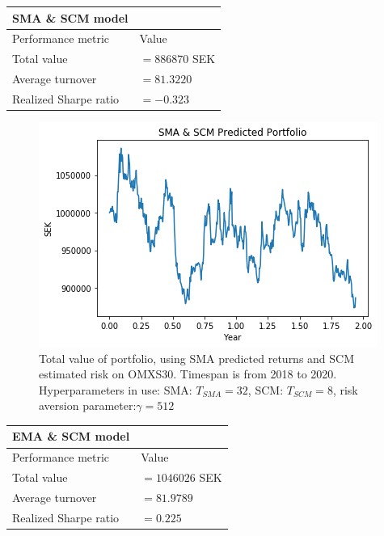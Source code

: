\documentclass[final]{LTHtwocol} %
\begin{document}
\begin{center}
 \begin{tabular}{||l l||} 
 \hline
 \textbf{SMA \& SCM  model} & \\ [0.5ex] 
 \hline
 Performance metric & Value\\ [0.5ex] 
 \hline\hline
 Total value & $=886870$ SEK \\ 
 \hline
 Average turnover& $=81.3220$ \\
 \hline
 Realized Sharpe ratio & $=-0.323$ \\  [1ex] 
 \hline
\end{tabular}
\label{tab:SMA and SCM data}
\end{center}
\begin{figure}[h]
	\centering
	\includegraphics[width=0.8\columnwidth]{Pics/result/SMA_SCM.png}
	\caption{Total value of portfolio, using SMA predicted returns and SCM estimated risk on OMXS30. Timespan is from 2018 to 2020. Hyperparameters in use: SMA: $T_{SMA} =32$, SCM: $T_{SCM} = 8$, risk aversion parameter:$\gamma= 512$}
	\label{fig:SMASCM} 
\end{figure}
\begin{center}
 \begin{tabular}{||l l||} 
 \hline
 \textbf{EMA \& SCM  model} & \\ [0.5ex] 
 \hline
 Performance metric & Value\\ [0.5ex] 
 \hline\hline
 Total value & $=1046026$ SEK \\ 
 \hline
 Average turnover& $=81.9789$ \\
 \hline
 Realized Sharpe ratio & $=0.225$ \\  [1ex] 
 \hline
\end{tabular}
\label{tab:EMA and SCM data}
\end{center}
\end{document}
